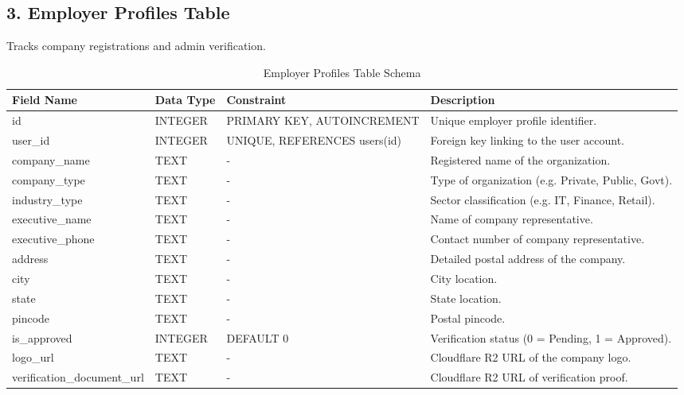 \documentclass[12pt,a4paper]{report}
\begin{document}
\subsection{3. Employer Profiles Table}
Tracks company registrations and admin verification.
\begin{table}[H]
\centering
\small
\begin{tabular}{|p{2.8cm}|p{2.0cm}|p{2.5cm}|p{6.7cm}|}
\hline
\textbf{Field Name} & \textbf{Data Type} & \textbf{Constraint} & \textbf{Description} \\ \hline
id & INTEGER & PRIMARY KEY, AUTOINCREMENT & Unique employer profile identifier. \\ \hline
user\_id & INTEGER & UNIQUE, REFERENCES users(id) & Foreign key linking to the user account. \\ \hline
company\_name & TEXT & - & Registered name of the organization. \\ \hline
company\_type & TEXT & - & Type of organization (e.g. Private, Public, Govt). \\ \hline
industry\_type & TEXT & - & Sector classification (e.g. IT, Finance, Retail). \\ \hline
executive\_name & TEXT & - & Name of company representative. \\ \hline
executive\_phone & TEXT & - & Contact number of company representative. \\ \hline
address & TEXT & - & Detailed postal address of the company. \\ \hline
city & TEXT & - & City location. \\ \hline
state & TEXT & - & State location. \\ \hline
pincode & TEXT & - & Postal pincode. \\ \hline
is\_approved & INTEGER & DEFAULT 0 & Verification status (0 = Pending, 1 = Approved). \\ \hline
logo\_url & TEXT & - & Cloudflare R2 URL of the company logo. \\ \hline
verification\_document\_url & TEXT & - & Cloudflare R2 URL of verification proof. \\ \hline
\end{tabular}
\caption{Employer Profiles Table Schema}
\end{table}

\newpage
\end{document}
